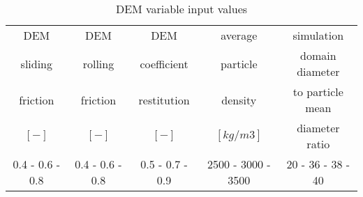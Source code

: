 \begin{table}[h]
\centering
\begin{tabular}{c|c|c|c|c}
\hline
	DEM   & DEM   & DEM   & average & simulation \\
    sliding & rolling & coefficient & particle & domain diameter \\
    friction & friction & restitution & density & to particle mean \\
    	$[-]$  & $[-]$   & $[-]$   & $[kg/m3]$ & diameter ratio \\
    \hline
    0.4 - 0.6 - 0.8 & 0.4 - 0.6 - 0.8 & 0.5 - 0.7 - 0.9 & 2500 - 3000 - 3500 & 20 - 36 - 38 - 40 \\

\hline
\end{tabular}
\caption{DEM variable input values}
\label{tab:10DEMVariableinputvalues}
\end{table}